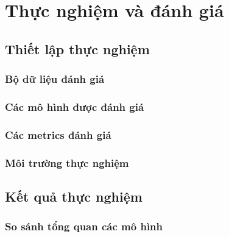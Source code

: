 \chapter{Thực nghiệm và đánh giá}

\section{Thiết lập thực nghiệm}

\subsection{Bộ dữ liệu đánh giá}

\subsection{Các mô hình được đánh giá}

\subsection{Các metrics đánh giá}

\subsection{Môi trường thực nghiệm}

\section{Kết quả thực nghiệm}

\subsection{So sánh tổng quan các mô hình}

